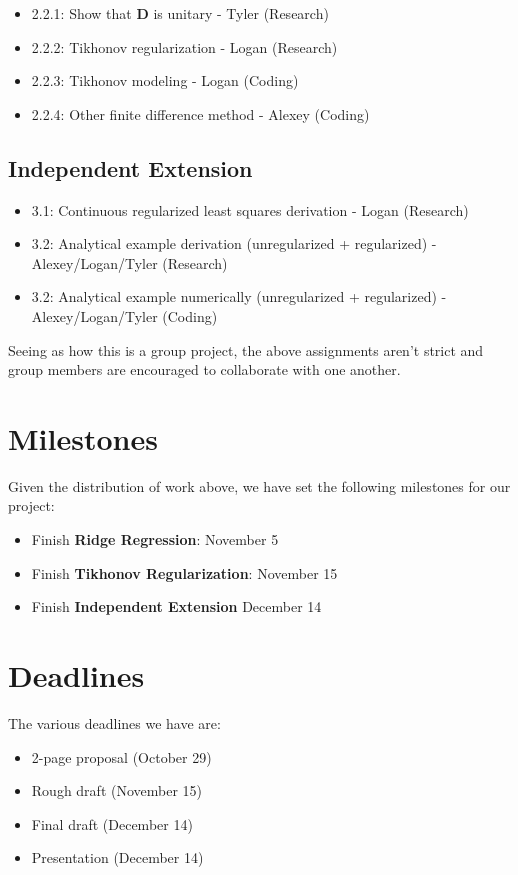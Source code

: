 \documentclass{article}
\begin{document}
    \begin{itemize}
        \item 2.2.1: Show that $\textbf{D}$ is unitary - Tyler (Research)
        \item 2.2.2: Tikhonov regularization - Logan (Research)
        \item 2.2.3: Tikhonov modeling - Logan (Coding)
        \item 2.2.4: Other finite difference method - Alexey (Coding)
    \end{itemize}

    \subsection{Independent Extension}

    \begin{itemize}
        \item 3.1: Continuous regularized least squares derivation - Logan (Research)
        \item 3.2: Analytical example derivation (unregularized + regularized) - Alexey/Logan/Tyler (Research)
        \item 3.2: Analytical example numerically (unregularized + regularized) - Alexey/Logan/Tyler (Coding)
    \end{itemize}

    Seeing as how this is a group project, the above assignments aren't strict and group members are encouraged to collaborate with one another.

    \section{Milestones}

    Given the distribution of work above, we have set the following milestones for our project:

    \begin{itemize}
        \item Finish \textbf{Ridge Regression}: November 5
        \item Finish \textbf{Tikhonov Regularization}: November 15
        \item Finish \textbf{Independent Extension} December 14
    \end{itemize}

    \section{Deadlines}

    The various deadlines we have are:

    \begin{itemize}
        \item 2-page proposal (October 29)
        \item Rough draft (November 15)
        \item Final draft (December 14)
        \item Presentation (December 14)
    \end{itemize}
\end{document}
